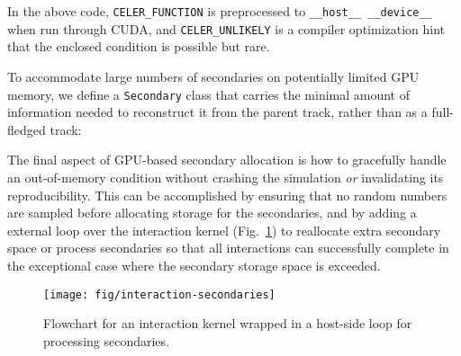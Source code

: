 \begin{Shaded}
\begin{Highlighting}[]
         \NormalTok{;}
\NormalTok{    \}}

    \NormalTok{ (}\NormalTok{;}
    \NormalTok{ (}
\NormalTok{    \{}
        \NormalTok{ (}\NormalTok{;}
\NormalTok{    \}}
\NormalTok{\}}
\end{Highlighting}
\end{Shaded}

In the above code, \texttt{CELER\_FUNCTION} is preprocessed to
\texttt{\_\_host\_\_\ \_\_device\_\_} when run through CUDA, and
\texttt{CELER\_UNLIKELY} is a compiler optimization hint that the
enclosed condition is possible but rare.

To accommodate large numbers of secondaries on potentially limited GPU
memory, we define a \texttt{Secondary} class that carries the minimal
amount of information needed to reconstruct it from the parent track,
rather than as a full-fledged track:

\begin{Shaded}
\begin{Highlighting}[]
\NormalTok{\{}

      \NormalTok{() }\NormalTok{;}
\NormalTok{\};}
\end{Highlighting}
\end{Shaded}

The final aspect of GPU-based secondary allocation is how to gracefully
handle an out-of-memory condition without crashing the simulation
\emph{or} invalidating its reproducibility. This can be accomplished by
ensuring that no random numbers are sampled before allocating storage
for the secondaries, and by adding a external loop
over the interaction
kernel (Fig.~\ref{fig:interaction}) to reallocate extra secondary space or
process secondaries so
that all interactions can successfully complete in the exceptional case
where the secondary storage space is exceeded.

\begin{figure}[htb]
  \centering
  \texttt{[image: fig/interaction-secondaries]}
  \caption{Flowchart for an interaction kernel wrapped in a host-side loop for
  processing secondaries.}
  \label{fig:interaction}
\end{figure}
